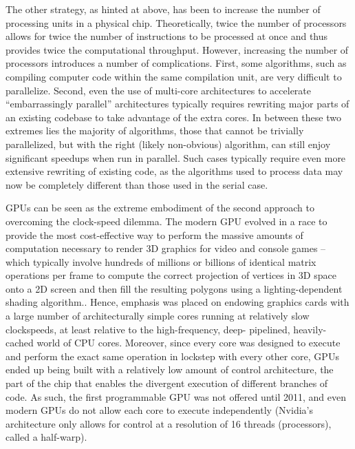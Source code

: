 \documentclass[twocolumn]{article}
\begin{document}
The other strategy, as hinted at above, has been to increase the number of processing units in a physical chip. Theoretically, twice the number of processors allows for twice the number of instructions to be processed at once and thus provides twice the computational throughput. However, increasing the number of processors introduces a number of complications. First, some algorithms, such as compiling computer code within the same compilation unit, are very difficult to parallelize. Second, even the use of multi-core architectures to accelerate “embarrassingly parallel” architectures typically requires rewriting major parts of an existing codebase to take advantage of the extra cores. In between these two extremes lies the majority of algorithms, those that cannot be trivially parallelized, but with the right (likely non-obvious) algorithm, can still enjoy significant speedups when run in parallel. Such cases typically require even more extensive rewriting of existing code, as the algorithms used to process data may now be completely different than those used in the serial case.

GPUs can be seen as the extreme embodiment of the second approach to overcoming the clock-speed dilemma. The modern GPU evolved in a race to provide the most cost-effective way to perform the massive amounts of computation necessary to render 3D graphics for video and console games – which typically involve hundreds of millions or billions of identical matrix operations per frame to compute the correct projection of vertices in 3D space onto a 2D screen and then fill the resulting polygons using a lighting-dependent shading algorithm.. Hence, emphasis was placed on endowing graphics cards with a large number of architecturally simple cores running at relatively slow clockspeeds, at least relative to the high-frequency, deep- pipelined, heavily-cached world of CPU cores. Moreover, since every core was designed to execute and perform the exact same operation in lockstep with every other core, GPUs ended up being built with a relatively low amount of control architecture, the part of the chip that enables the divergent execution of different branches of code. As such, the first programmable GPU was not offered until 2011, and even modern GPUs do not allow each core to execute independently (Nvidia’s architecture only allows for control at a resolution of 16 threads (processors), called a half-warp).
\end{document}
